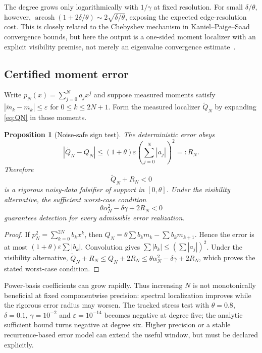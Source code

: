 \documentclass[11pt]{article}
\newtheorem{proposition}[theorem]{Proposition}
\theoremstyle{definition}
\theoremstyle{remark}
\newcommand{\eps}{\varepsilon}
\begin{document}
The degree grows only logarithmically with $1/\gamma$ at fixed resolution.
For small $\delta/\theta$, however,
$\operatorname{arcosh}(1+2\delta/\theta)\sim2\sqrt{\delta/\theta}$,
exposing the expected edge-resolution cost.  This is closely related to the
Chebyshev mechanism in Kaniel--Paige--Saad convergence bounds, but here the
output is a one-sided moment localizer with an explicit visibility premise,
not merely an eigenvalue convergence estimate~\cite{Saad1980,FilteredRR}.

\subsection{Certified moment error}

Write $p_N(x)=\sum_{j=0}^Na_jx^j$ and suppose measured moments satisfy
$|\widetilde m_k-m_k|\leq\eps$ for $0\leq k\leq2N+1$.  Form the measured
localizer $\widetilde Q_N$ by expanding \cref{eq:QN} in those moments.

\begin{proposition}[Noise-safe sign test]               \label{prop:noise}
The deterministic error obeys
\begin{equation}
 |\widetilde Q_N-Q_N|
 \leq(1+\theta)\eps\left(\sum_{j=0}^N|a_j|\right)^2
 =:R_N.                                                \label{eq:noiseradius}
\end{equation}
Therefore
\begin{equation}
 \widetilde Q_N+R_N<0                                 \label{eq:certsign}
\end{equation}
is a rigorous noisy-data falsifier of support in $[0,\theta]$.  Under the
visibility alternative, the sufficient worst-case condition
\begin{equation}
 \theta\alpha_N^2-\delta\gamma+2R_N<0                 \label{eq:robustdepth}
\end{equation}
guarantees detection for every admissible error realization.
\end{proposition}

\begin{proof}
If $p_N^2=\sum_{k=0}^{2N}b_kx^k$, then
$Q_N=\theta\sum b_km_k-\sum b_km_{k+1}$.  Hence the error is at most
$(1+\theta)\eps\sum|b_k|$.  Convolution gives
$\sum|b_k|\leq(\sum|a_j|)^2$.  Under the visibility alternative,
$\widetilde Q_N+R_N\leq Q_N+2R_N\leq
\theta\alpha_N^2-\delta\gamma+2R_N$, which proves the stated worst-case
condition.
\end{proof}

Power-basis coefficients can grow rapidly.  Thus increasing $N$ is not
monotonically beneficial at fixed componentwise precision: spectral
localization improves while the rigorous error radius may worsen.  The tracked
stress test with $\theta=0.8$, $\delta=0.1$, $\gamma=10^{-2}$ and
$\eps=10^{-14}$ becomes negative at degree five; the analytic sufficient bound
turns negative at degree six.  Higher precision or a stable recurrence-based
error model can extend the useful window, but must be declared explicitly.
\end{document}
